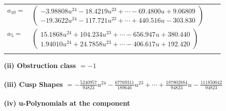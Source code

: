 \documentclass[1p]{elsarticle_modified}
\theoremstyle{definition}
\begin{document}
\begin{tabular}{m{7pt} m{180pt} m{7pt} m{180pt} }
\flushright $a_{10}=$&$\begin{pmatrix}-3.98808 u^{24}-18.4219 u^{23}+\cdots-69.4800 u+9.06809\\-19.3622 u^{24}-117.721 u^{23}+\cdots+440.516 u-303.830\end{pmatrix}$ \\
\flushright $a_{5}=$&$\begin{pmatrix}15.1868 u^{24}+104.234 u^{23}+\cdots-656.947 u+380.440\\1.94010 u^{24}+24.7858 u^{23}+\cdots-406.617 u+192.420\end{pmatrix}$\\&\end{tabular}
\flushleft \textbf{(ii) Obstruction class $= -1$}\\~\\
\flushleft \textbf{(iii) Cusp Shapes $= -\frac{5240957}{94823} u^{24}-\frac{67769311}{189646} u^{23}+\cdots+\frac{187802884}{94823} u-\frac{111850042}{94823}$}\\~\\
\newpage\renewcommand{\arraystretch}{1}
\flushleft \textbf{(iv) u-Polynomials at the component}\newline \\
\end{document}
